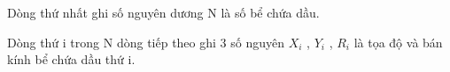 Dòng thứ nhất ghi số nguyên dương N là số bể chứa dầu.  

   Dòng thứ i trong N dòng tiếp theo ghi 3 số nguyên $X_{i}$   , $Y_{i}$   , $R_{i}$   là tọa độ và bán kính bể chứa dầu thứ i.